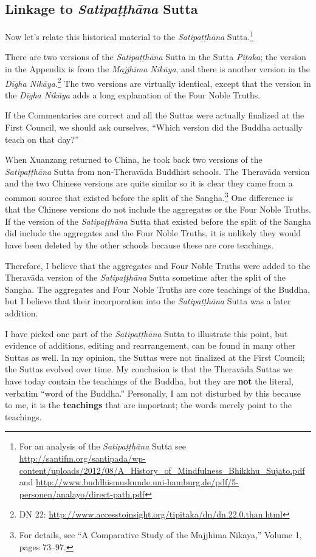 \subsection*{Linkage to \textit{Satipaṭṭhāna} Sutta}
Now let’s relate this historical material to the \textit{Satipaṭṭhāna} Sutta.\footnote{For an analysis of the \textit{Satipaṭṭhāna} Sutta see \url{http://santifm.org/santipada/wp-content/uploads/2012/08/A_History_of_Mindfulness_Bhikkhu_Sujato.pdf} and \url{http://www.buddhismuskunde.uni-hamburg.de/pdf/5-personen/analayo/direct-path.pdf}}

There are two versions of the \textit{Satipaṭṭhāna} Sutta in the Sutta \textit{Piṭaka}; the version in the Appendix is from the \textit{Majjhima Nikāya}, and there is another version in the \textit{Dīgha Nikāya}.\footnote{DN 22: \url{http://www.accesstoinsight.org/tipitaka/dn/dn.22.0.than.html}} The two versions are virtually identical, except that the version in the \textit{Dīgha Nikāya} adds a long explanation of the Four Noble Truths. 

If the Commentaries are correct and all the Suttas were actually finalized at the First Council, we should ask ourselves, “Which version did the Buddha actually teach on that day?”

When Xuanzang returned to China, he took back two versions of the \textit{Satipaṭṭhāna} Sutta from non-Theravāda Buddhist schools. The Theravāda version and the two Chinese versions are quite similar so it is clear they came from a common source that existed before the split of the Sangha.\footnote{For details, see “A Comparative Study of the Majjhima Nikāya,” Volume 1, pages 73--97.} One difference is that the Chinese versions do not include the aggregates or the Four Noble Truths. If the version of the \textit{Satipaṭṭhāna} Sutta that existed before the split of the Sangha did include the aggregates and the Four Noble Truths, it is unlikely they would have been deleted by the other schools because these are core teachings. 

Therefore, I believe that the aggregates and Four Noble Truths were added to the Theravāda version of the \textit{Satipaṭṭhāna} Sutta sometime after the split of the Sangha. The aggregates and Four Noble Truths are core teachings of the Buddha, but I believe that their incorporation into the \textit{Satipaṭṭhāna} Sutta was a later addition.

I have picked one part of the \textit{Satipaṭṭhāna} Sutta to illustrate this point, but evidence of additions, editing and rearrangement, can be found in many other Suttas as well. In my opinion, the Suttas were not finalized at the First Council; the Suttas evolved over time. My conclusion is that the Theravāda Suttas we have today contain the teachings of the Buddha, but they are \textbf{not} the literal, verbatim “word of the Buddha.” Personally, I am not disturbed by this because to me, it is the \textbf{teachings} that are important; the words merely point to the teachings.

